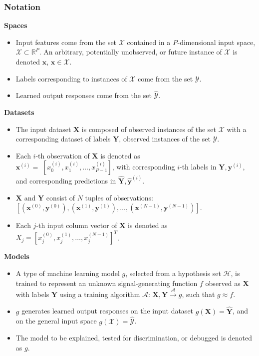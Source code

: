 \documentclass[11pt,aspectratio=169,hyperref={colorlinks}]{beamer}
\begin{document}
		\begin{frame}[allowframebreaks]
			
			\frametitle{Notation}
		
			\textbf{Spaces} 
 
			\begin{itemize}
				\item Input features come from the set $\mathcal{X}$ contained in a \textit{P}-dimensional input space, $\mathcal{X} \subset \mathbb{R}^P$.  An arbitrary, potentially unobserved, or future instance of $\mathcal{X}$ is denoted $\mathbf{x}$, $\mathbf{x} \in \mathcal{X}$.
				\item Labels corresponding to instances of $\mathcal{X}$ come from the set $\mathcal{Y}$.
				\item Learned output responses come from the set $\mathcal{\hat{Y}}$.
			\end{itemize}	
	
			\framebreak	
	
			\textbf{Datasets} 

			\begin{itemize}
				\item The input dataset $\mathbf{X}$ is composed of observed instances of the set $\mathcal{X}$ with a corresponding dataset of labels $\mathbf{Y}$, observed instances of the set $\mathcal{Y}$. 
				\item Each $i$-th observation of $\mathbf{X}$ is denoted as\\ $\mathbf{x}^{(i)} = $  
		$[x_0^{(i)}, x_1^{(i)}, \dots, x_{\textit{P}-1}^{(i)}]$, with corresponding $i$-th labels in $\mathbf{Y}, \mathbf{y}^{(i)}$, and corresponding predictions in $\mathbf{\hat{Y}}, \mathbf{\hat{y}}^{(i)}$.
				\item $\mathbf{X}$ and $\mathbf{Y}$ consist of $N$ tuples of observations:\\ $[(\mathbf{x}^{(0)},\mathbf{y}^{(0)}), (\mathbf{x}^{(1)},\mathbf{y}^{(1)}), \dots,(\mathbf{x}^{(N-1)},\mathbf{y}^{(N-1)})]$.
				\item Each $j$-th input column vector of $\mathbf{X}$ is denoted as $X_j = [x_{j}^{(0)}, x_{j}^{(1)}, \dots, x_{j}^{(N-1)}]^T$.
			\end{itemize}	 
	
			\framebreak
				
			\textbf{Models}

			\begin{itemize}
				\item A type of machine learning model $g$, selected from a hypothesis set $\mathcal{H}$, is trained to represent an unknown signal-generating function $f$ observed as  $\mathbf{X}$ with labels $\mathbf{Y}$ using a training algorithm $\mathcal{A}$: 
		$ \mathbf{X}, \mathbf{Y} \xrightarrow{\mathcal{A}} g$, such that $g \approx f$.
				\item $g$ generates learned output responses on the input dataset $g(\mathbf{X}) = \mathbf{\hat{Y}}$, and on the general input space $g(\mathcal{X}) = \mathcal{\hat{Y}}$.
				\item The model to be explained, tested for discrimination, or debugged is denoted as $g$.
			\end{itemize}
		

\end{frame}
\end{document}
